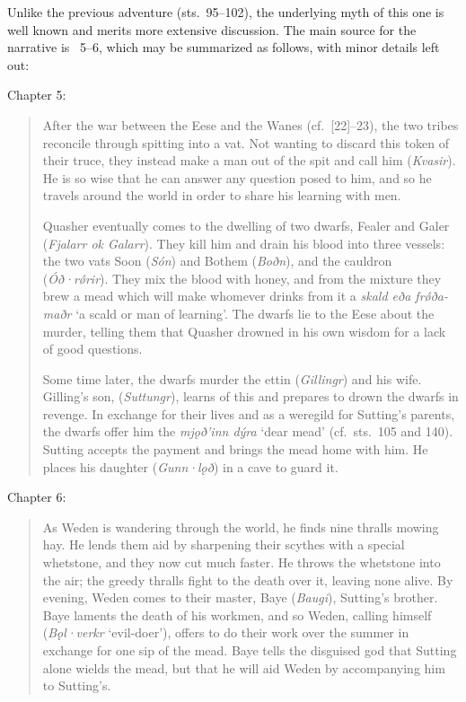 Unlike the previous adventure (sts.~95--102), the underlying myth of this one is well known and merits more extensive discussion.  The main source for the narrative is \Skaldskaparmal\ 5--6, which may be summarized as follows, with minor details left out:

\begin{small}
	Chapter 5:
	\begin{quote}
	After the war between the Eese and the Wanes (cf.~[22]--23), the two tribes reconcile through spitting into a vat.  Not wanting to discard this token of their truce, they instead make a man out of the spit and call him  (\emph{Kvasir}).  He is so wise that he can answer any question posed to him, and so he travels around the world in order to share his learning with men.

	Quasher eventually comes to the dwelling of two dwarfs, Fealer and Galer (\emph{Fjalarr ok Galarr}). They kill him and drain his blood into three vessels: the two vats Soon (\emph{Són}) and Bothem (\emph{Boðn}), and the cauldron  (\emph{Óð·rǿrir}).  They mix the blood with honey, and from the mixture they brew a mead which will make whomever drinks from it a \emph{skald eða frǿða-maðr} ‘a scald or man of learning’.  The dwarfs lie to the Eese about the murder, telling them that Quasher drowned in his own wisdom for a lack of good questions.

	Some time later, the dwarfs murder the ettin  (\emph{Gillingr}) and his wife.  Gilling’s son,  (\emph{Suttungr}), learns of this and prepares to drown the dwarfs in revenge.  In exchange for their lives and as a weregild for Sutting’s parents, the dwarfs offer him the \emph{mjǫð’inn dýra} ‘dear mead’ (cf.~sts.~105 and 140).  Sutting accepts the payment and brings the mead home with him.  He places his daughter  (\emph{Gunn·lǫð}) in a cave to guard it.
	\end{quote}

	Chapter 6:\nobreak
	\begin{quote}
	As Weden is wandering through the world, he finds nine thralls mowing hay.  He lends them aid by sharpening their scythes with a special whetstone, and they now cut much faster.  He throws the whetstone into the air; the greedy thralls fight to the death over it, leaving none alive.  By evening, Weden comes to their master, Baye (\emph{Baugi}), Sutting’s brother.  Baye laments the death of his workmen, and so Weden, calling himself  (\emph{Bǫl·verkr} ‘evil-doer’), offers to do their work over the summer in exchange for one sip of the mead.  Baye tells the disguised god that Sutting alone wields the mead, but that he will aid Weden by accompanying him to Sutting’s.


\end{quote}
\end{small}
